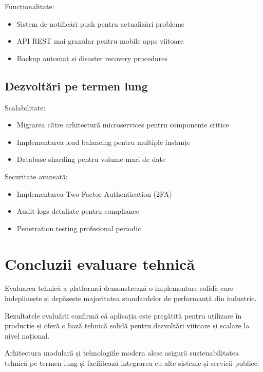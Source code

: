 \documentclass[12pt,a4paper]{report}
\begin{document}
Funcționalitate:
\begin{itemize}
\item Sistem de notificări push pentru actualizări probleme
\item API REST mai granular pentru mobile apps viitoare
\item Backup automat și disaster recovery procedures
\end{itemize}

\subsection{Dezvoltări pe termen lung}

Scalabilitate:
\begin{itemize}
\item Migrarea către arhitectură microservices pentru componente critice
\item Implementarea load balancing pentru multiple instanțe
\item Database sharding pentru volume mari de date
\end{itemize}

Securitate avansată:
\begin{itemize}
\item Implementarea Two-Factor Authentication (2FA)
\item Audit logs detaliate pentru compliance
\item Penetration testing profesional periodic
\end{itemize}

\section{Concluzii evaluare tehnică}

Evaluarea tehnică a platformei  demonstrează o implementare solidă care îndeplinește și depășește majoritatea standardelor de performanță din industrie.

Rezultatele evaluării confirmă că aplicația este pregătită pentru utilizare în producție și oferă o bază tehnică solidă pentru dezvoltări viitoare și scalare la nivel național.

Arhitectura modulară și tehnologiile modern alese   asigură sustenabilitatea tehnică pe termen lung și facilitează integrarea cu alte sisteme și servicii publice.

\newpage
{}
\end{document}
